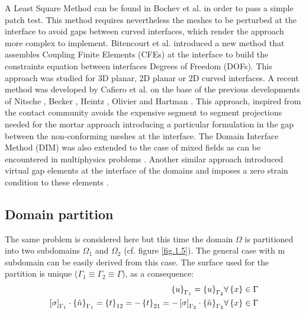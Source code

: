  A Least Square Method can be found in Bochev et al. \cite{bochev2007least} in order to pass a simple patch test. This method requires nevertheless the meshes to be perturbed at the interface to avoid gaps between curved interfaces, which render the approach more complex to implement.
 Bitencourt et al. \cite{bitencourt2015coupling} introduced a new method that assembles Coupling Finite Elements (CFEs) at the interface to build the constraints equation between interfaces Degrees of Freedom (DOFs). This approach was studied for 3D planar, 2D planar or 2D curved interfaces. 
 A recent method was developed by Cafiero et al. \cite{cafiero2016domain} on the base of the previous developments of Nitsche  \cite{nitsche1971variationsprinzip}, Becker \cite{becker2003finite}, Heintz \cite{heintz2006stabilized} , Olivier \cite{oliver2009contact} and Hartman \cite{hartmann2009contact}. This approach, inspired from the contact community avoids the expensive segment to segment projections needed for the mortar approach introducing a particular formulation in the gap between the non-conforming meshes at the interface. The Domain Interface Method (DIM) \cite{cafiero2016domain} was also extended to the case of mixed fields as can be encountered in multiphysics problems \cite{lloberas2017domain}. Another similar approach introduced virtual gap elements at the interface of the domains and imposes a zero strain condition to these elements \cite{song2017virtual}.
 \\
 \subsection{Domain partition}\label{ssec22}
The same problem is considered here but this time the domain $\Omega$ is partitioned into two subdomains $\Omega_1$ and $\Omega_2$ (cf. figure \ref{fig.1.5}). The general case with m subdomain can be easily derived from this case. The surface used for the partition is unique  ($\Gamma_1 \equiv \Gamma_2 \equiv \Gamma$), as a consequence:
 \begin{eqnarray}
 \label{eq.13}
 \left\lbrace{u}\right \rbrace_{\Gamma_1}=\left\lbrace{u}\right \rbrace_{\Gamma_2} & \forall \left\lbrace{x}\right \rbrace \in \Gamma\\
 \label{eq.14}
 \left[{\sigma}\right]_{\Gamma_1}\cdot\left\lbrace{\hat{n}}\right \rbrace_{\Gamma_1}=\left\lbrace{t}\right \rbrace_{12}=-\left\lbrace{t}\right \rbrace_{21}=-\left[{\sigma}\right]_{\Gamma_2}\cdot\left\lbrace{\hat{n}}\right \rbrace_{\Gamma_2} & \forall \left\lbrace{x}\right \rbrace \in \Gamma
 \end{eqnarray}
 
